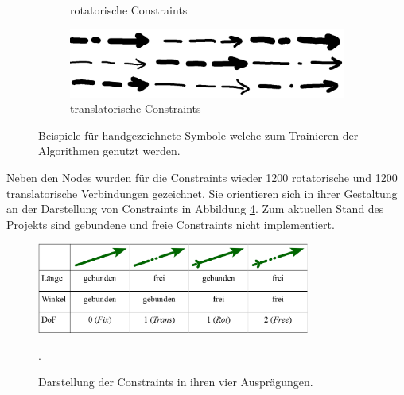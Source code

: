 \begin{figure}
\begin{subfigure}[b]{0.4\textwidth}
      \caption{rotatorische Constraints}
      \label{fig:rs}
    \end{subfigure}
    \begin{subfigure}[b]{0.4\textwidth}
      \includegraphics[width=\textwidth]{images/ts.png}
      \caption{translatorische Constraints}
      \label{fig:ts}
    \end{subfigure}
    \caption{Beispiele für handgezeichnete Symbole welche zum Trainieren der Algorithmen genutzt werden.}
    \label{fig:example_symbols}
\end{figure}

Neben den Nodes wurden für die Constraints wieder 1200 rotatorische und 1200 translatorische Verbindungen gezeichnet.
Sie orientieren sich in ihrer Gestaltung an der Darstellung von Constraints in Abbildung \ref{fig:constraints_gtk}.
Zum aktuellen Stand des Projekts sind gebundene und freie Constraints nicht implementiert.

\begin{figure}
  \centering
  \includegraphics[width=0.8\textwidth]{images/gtk2019_tab1.png}
  \caption{Darstellung der Constraints in ihren vier Ausprägungen. \cite[Tab. 1]{Goessner2019a}}.
  \label{fig:constraints_gtk}
\end{figure}
